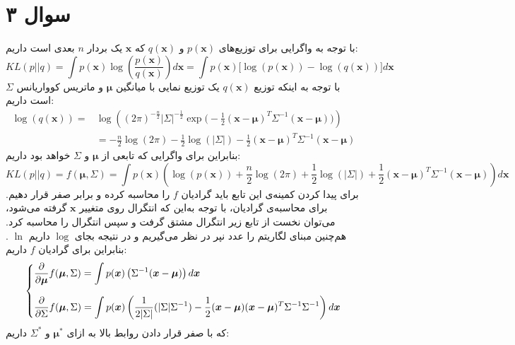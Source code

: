 \documentclass[a4paper, 12pt]{article}
\begin{document}
\section*{سوال ۳}
با توجه به واگرایی  برای توزیع‌های $p(\bm{x})$ و $q(\bm{x})$ که $\bm{x}$ یک بردار $n$ بعدی است داریم:
\[
KL(p||q) = \int p(\bm{x}) \log\left(\frac{p(\bm{x})}{q(\bm{x})}\right) d\bm{x} = \int p(\bm{x}) \big[\log(p(\bm{x})) - \log(q(\bm{x}))\big] d\bm{x}
\]
با توجه به اینکه توزیع $q(\bm{x})$ یک توزیع نمایی با میانگین $\bm{\mu}$ و ماتریس کوواریانس
$\Sigma$
است داریم:
\[
\begin{aligned}
	\log(q(\bm{x})) = & \log\left((2\pi)^{-\frac{n}{2}}|\Sigma|^{-\frac{1}{2}} \exp\big(-\frac{1}{2}(\bm{x}-\bm{\mu})^T\Sigma^{-1}(\bm{x}-\bm{\mu})\big)\right) \\[0.4em]
	&= -\frac{n}{2}\log(2\pi) - \frac{1}{2} \log(|\Sigma|) - \frac{1}{2}(\bm{x}-\bm{\mu})^T\Sigma^{-1}(\bm{x}-\bm{\mu})
\end{aligned}
\]
بنابراین برای واگرایی  که تابعی از $\bm{\mu}$ و $\Sigma$ خواهد بود داریم:
\[
KL(p||q) = f(\bm{\mu},\Sigma) = \int p(\bm{x}) \left(\log(p(\bm{x})) + \frac{n}{2} \log(2\pi) + \frac{1}{2}\log(|\Sigma|) + \frac{1}{2}(\bm{x}-\bm{\mu})^T\Sigma^{-1}(\bm{x}-\bm{\mu})\right) d\bm{x}
\]
برای پیدا کردن کمینه‌ی این تابع باید گرادیان $f$ را محاسبه کرده و برابر صفر قرار دهیم. برای محاسبه‌ی گرادیان، با توجه به‌این که انتگرال روی متغییر $\bm{x}$ گرفته می‌شود، می‌توان نخست از تابع زیر انتگرال مشتق گرفت و سپس انتگرال را محاسبه کرد. هم‌چنین مبنای لگاریتم را عدد نپر در نظر می‌گیریم و در نتیجه بجای $\log$ داریم $\ln$ . بنابراین برای گرادیان $f$ داریم:
\[
\begin{dcases}
	\frac{\partial}{\partial \bm{\mu}} f(\bm{\mu}, \Sigma) = \int p(\bm{x}) \left(\Sigma^{-1}(\bm{x}-\bm{\mu})\right) d\bm{x} \\[0.7em]
	\frac{\partial}{\partial \Sigma} f(\bm{\mu},\Sigma) = \int p(\bm{x}) \left(\frac{1}{2|\Sigma|}(|\Sigma|\Sigma^{-1}) - \frac{1}{2}(\bm{x}-\bm{\mu})(\bm{x}-\bm{\mu})^T \Sigma^{-1}\Sigma^{-1}\right) d\bm{x}
\end{dcases}
\]
که با صفر قرار دادن روابط بالا به ازای
$\bm{\mu}^\ast$
و
$\Sigma^\ast$
داریم:
\end{document}
